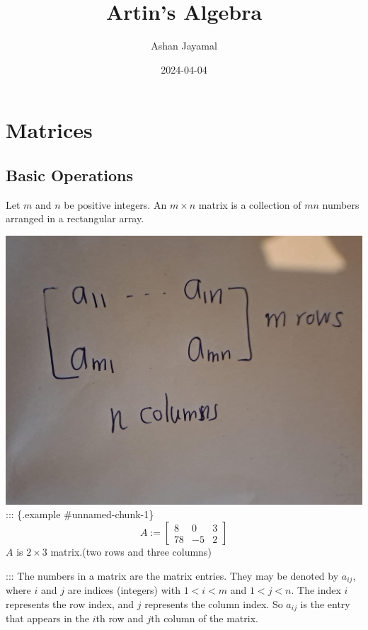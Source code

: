 \documentclass[
]{book}
\title{Artin's Algebra}
\author{Ashan Jayamal}
\date{2024-04-04}
\theoremstyle{definition}
\theoremstyle{definition}
\theoremstyle{definition}
\theoremstyle{definition}
\theoremstyle{remark}
\begin{document}
\maketitle

{
\setcounter{tocdepth}{1}
\tableofcontents
}
\hypertarget{matrices}{%
\chapter{Matrices}\label{matrices}}

\hypertarget{basic-operations}{%
\section{Basic Operations}\label{basic-operations}}

Let \(m\) and \(n\) be positive integers. An \(m \times n\) matrix is a collection of \(mn\) numbers arranged in a rectangular array.

\includegraphics{figures/ch_1/fig01.jpg}
::: \{.example \#unnamed-chunk-1\}
\[A:=\begin{bmatrix}
8 & 0 & 3\\
78 & -5 & 2
\end{bmatrix}\]
\(A\) is \(2 \times 3\) matrix.(two rows and three columns)

:::
The numbers in a matrix are the matrix entries. They may be denoted by \(a_{ij}\), where \(i\) and \(j\) are indices (integers) with \(1 < i < m\) and \(1 < j < n\). The index \(i\) represents the row index, and \(j\) represents the column index. So \(a_{ij}\) is the entry that appears in the \(i\)th row and \(j\)th column of the matrix.
\end{document}
